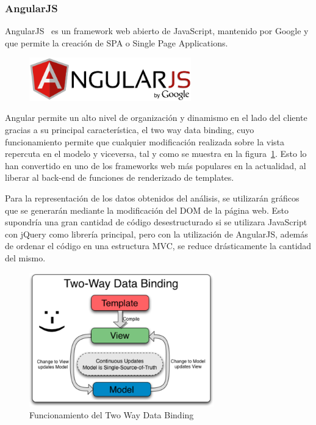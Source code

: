 \documentclass[a4paper, spanish, 12pt]{book}
\begin{document}
\subsubsection*{AngularJS}
\label{subsec:angularjs}

AngularJS~\cite{angular} es un framework web abierto de JavaScript, mantenido por Google y que
permite la creaci\'on de SPA o Single Page Applications.

\begin{figure}[H]
  \centering
  \includegraphics[width=7cm, keepaspectratio]{img/angular-logo}
\end{figure}

Angular permite un alto nivel de organizaci\'on y dinamismo en el lado del cliente
gracias a su principal caracter\'istica, el two way data binding, cuyo
funcionamiento permite que cualquier modificaci\'on realizada sobre la vista
repercuta en el modelo y viceversa, tal y como se muestra en la figura~\ref{fig:2waydatabinding}.
Esto lo han convertido en uno de los frameworks web m\'as populares en la actualidad,
al liberar al back-end de funciones de renderizado de templates.

Para la representaci\'on de los datos obtenidos del an\'alisis, se utilizar\'an
gr\'aficos que se generar\'an mediante la modificaci\'on del DOM de la p\'agina web.
Esto supondr\'ia una gran cantidad de c\'odigo desestructurado si se utilizara JavaScript con jQuery
como librer\'ia principal, pero con la utilizaci\'on de AngularJS, adem\'as de
ordenar el c\'odigo en una estructura MVC, se reduce dr\'asticamente la cantidad
del mismo.

\begin{figure}[H]
    \centering
    \includegraphics[width=8cm, keepaspectratio]{img/2waydatabinding}
    \caption{Funcionamiento del Two Way Data Binding}
    \label{fig:2waydatabinding}
\end{figure}
\end{document}
